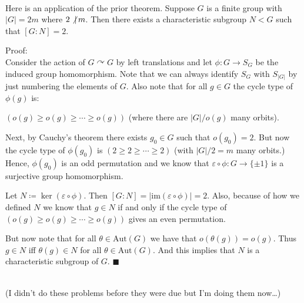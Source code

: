 \documentclass{book}
\newcommand{\hTwo}{%
\color{Black}%
   \fontsize{13}{15}\selectfont%
}
\newcommand{\pracTwo}{
   \color{Orange}%
   \fontsize{12}{14}\selectfont%
}
\newcommand{\Hstatement}{%
   \color{MidnightBlue!90!Black}%
   \fontsize{12}{13}\selectfont%
}
\newenvironment{myIndent}{%
   \begin{adjustwidth}{2.5em}{0em}%
}{%
   \end{adjustwidth}%
}
\newcommand{\myIm}{\mathrm{im}}
\newcommand{\Aut}{\mathrm{Aut}}
\newcommand{\divides}{\mathop{\mid}}
\newcommand{\mySepTwo}[1][.]{%
   {\noindent\color{#1}{\rule{6.5in}{0.5mm}}}\\%
}
\newcommand{\retTwo}{\hfill\bigbreak}
\begin{document}
\hTwo\mySepTwo

Here is an application of the prior theorem. Suppose $G$ is a finite group with $|G| = 2m$ where $2 \not\divides m$. Then there exists a characteristic subgroup $N < G$ such that $[G : N] = 2$.

\begin{myIndent}\pracTwo
	Proof:\\
	Consider the action of $G \curvearrowright G$ by left translations and let $\phi: G \to S_G$ be the induced group homomorphism. Note that we can always identify $S_G$ with $S_{|G|}$ by just numbering the elements of $G$. Also note that for all $g \in G$ the cycle type of $\phi(g)$ is:
	
	{\centering$(o(g) \geq o(g) \geq \cdots \geq o(g))$ (where there are $|G| / o(g)$ many orbits).\retTwo\par}

	Next, by Cauchy's theorem there exists $g_0 \in G$ such that $o(g_0) = 2$. But now the cycle type of $\phi(g_0)$ is $(2 \geq 2 \geq \cdots \geq 2)$ (with $|G| / 2 = m$ many orbits.) Hence, $\phi(g_0)$ is an odd permutation and we know that $\varepsilon \circ \phi: G \to \{\pm 1\}$ is a surjective group homomorphism.\retTwo

	Let $N \coloneqq \ker(\varepsilon \circ \phi)$. Then $[G : N] = |\myIm(\varepsilon \circ \phi)| = 2$. Also, because of how we defined $N$ we know that $g \in N$ if and only if the cycle type of $(o(g) \geq o(g) \geq \cdots \geq o(g))$ gives an even permutation.\retTwo

	But now note that for all $\theta \in \Aut(G)$ we have that $o(\theta(g)) = o(g)$. Thus $g \in N$ iff $\theta(g) \in N$ for all $\theta \in \Aut(G)$. And this implies that $N$ is a characteristic subgroup of $G$. $\blacksquare$
\end{myIndent}

\Hstatement\mySepTwo

{\color{Red} (I didn't do these problems before they were due but I'm doing them now\dots)\retTwo}
\end{document}
